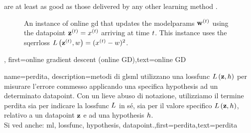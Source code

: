 {{are at least as good as those delivered by any other learning method \cite{HazanOCO,GDOptimalRakhlin2012}. 
\begin{figure}[H]
	\begin{center}
\end{center} 
\caption{An instance of online \gls{gd} that updates the \gls{modelparams} ${\bf w}^{(t)}$ 
using the \gls{datapoint} ${\bf z}^{(t)} = x^{(t)}$ arriving at time $t$. 
This instance uses the \gls{sqerrloss} $L\left({\bf z}^{(t)},w \right) = (x^{(t)} - w)^{2}$.
}
\end{figure}},
first={online gradient descent (online GD)},text={online GD}}

	
{name={perdita}, 
	description={\I metodi di gls{ml} utilizzano una 
		\gls{lossfunc} $L\left({\bf z},h \right)$ per misurare l’errore commesso 
		applicando una specifica \gls{hypothesis} ad un determinato \gls{datapoint}. Con un lieve 
		abuso di notazione, utilizziamo il termine perdita sia per indicare la \gls{lossfunc} $L$ 
		in sé, sia per il valore specifico $L\left({\bf z},h \right)$, relativo a un \gls{datapoint} ${\bf z}$ 
		e ad una \gls{hypothesis} $h$.
				\\
		Si ved anche: \gls{ml}, \gls{lossfunc}, \gls{hypothesis}, \gls{datapoint}.},first={perdita},text={perdita} }

